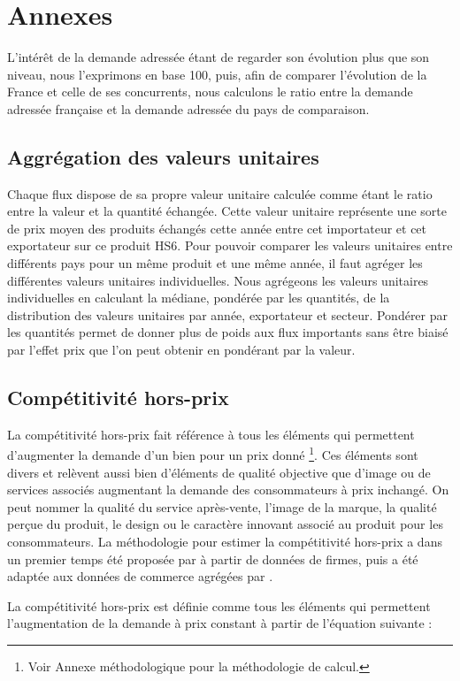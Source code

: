 \documentclass[french,10pt,a4paper]{article}
\newenvironment{annexes}{
    \section*{Annexes}
    \addcontentsline{toc}{section}{Annexes}
    \setstretch{2} %
}{
    \setstretch{1} %
}
\begin{document}
\begin{annexes}
L'intérêt de la demande adressée étant de regarder son évolution plus que son niveau, nous l'exprimons en base 100, puis, afin de comparer l'évolution de la France et celle de ses concurrents, nous calculons le ratio entre la demande adressée française et la demande adressée du pays de comparaison. 

\subsection*{Aggrégation des valeurs unitaires}

Chaque flux dispose de sa propre valeur unitaire calculée comme étant le ratio entre la valeur et la quantité échangée. Cette valeur unitaire représente une sorte de prix moyen des produits échangés cette année entre cet importateur et cet exportateur sur ce produit HS6. Pour pouvoir comparer les valeurs unitaires entre différents pays pour un même produit et une même année, il faut agréger les différentes valeurs unitaires individuelles. Nous agrégeons les valeurs unitaires individuelles en calculant la médiane, pondérée par les quantités, de la distribution des valeurs unitaires par année, exportateur et secteur. Pondérer par les quantités permet de donner plus de poids aux flux importants sans être biaisé par l'effet prix que l'on peut obtenir en pondérant par la valeur.

\subsection*{Compétitivité hors-prix}
La compétitivité hors-prix fait référence à tous les éléments qui permettent d'augmenter la demande d'un bien pour un prix donné \footnote{Voir Annexe méthodologique pour la méthodologie de calcul.}. Ces éléments sont divers et relèvent aussi bien d'éléments de qualité objective que d'image ou de services associés augmentant la demande des consommateurs à prix inchangé. On peut nommer la qualité du service après-vente, l'image de la marque, la qualité perçue du produit, le design ou le caractère innovant associé au produit pour les consommateurs. La méthodologie pour estimer la compétitivité hors-prix a dans un premier temps été proposée par \cite{Khandelwal2013} à partir de données de firmes, puis a été adaptée aux données de commerce agrégées par \cite{Bas2015}.

La compétitivité hors-prix est définie comme tous les éléments qui permettent l'augmentation de la demande à prix constant à partir de l'équation suivante :


\end{annexes}
\end{document}
